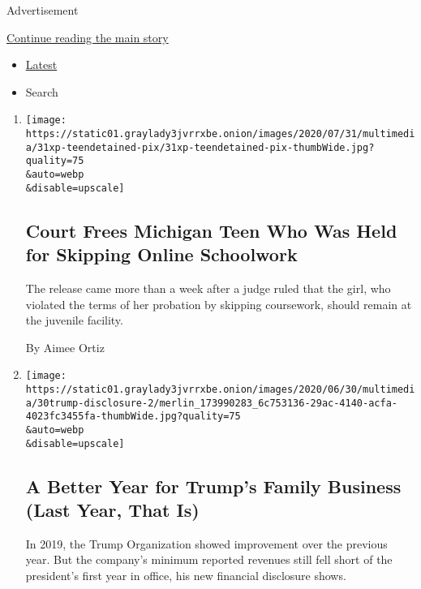 Advertisement

\protect\hyperlink{after-mid1}{Continue reading the main story}

\begin{itemize}
\tightlist
\item
  \protect\hyperlink{stream-panel}{Latest}
\item
  Search
\end{itemize}

\begin{enumerate}
\def\labelenumi{\arabic{enumi}.}
\item
  \href{/2020/07/31/us/michigan-teen-homework-release.html}{}

  \texttt{[image: https://static01.graylady3jvrrxbe.onion/images/2020/07/31/multimedia/31xp-teendetained-pix/31xp-teendetained-pix-thumbWide.jpg?quality=75\\\&auto=webp\\\&disable=upscale]}

  \hypertarget{court-frees-michigan-teen-who-was-held-for-skipping-online-schoolwork}{%
  \subsection{Court Frees Michigan Teen Who Was Held for Skipping Online
  Schoolwork}\label{court-frees-michigan-teen-who-was-held-for-skipping-online-schoolwork}}

  The release came more than a week after a judge ruled that the girl,
  who violated the terms of her probation by skipping coursework, should
  remain at the juvenile facility.

  By Aimee Ortiz
\item
  \href{/2020/07/31/business/trump-financial-disclosure.html}{}

  \texttt{[image: https://static01.graylady3jvrrxbe.onion/images/2020/06/30/multimedia/30trump-disclosure-2/merlin\_173990283\_6c753136-29ac-4140-acfa-4023fc3455fa-thumbWide.jpg?quality=75\\\&auto=webp\\\&disable=upscale]}

  \hypertarget{a-better-year-for-trumps-family-business-last-year-that-is}{%
  \subsection{A Better Year for Trump's Family Business (Last Year, That
  Is)}\label{a-better-year-for-trumps-family-business-last-year-that-is}}

  In 2019, the Trump Organization showed improvement over the previous
  year. But the company's minimum reported revenues still fell short of
  the president's first year in office, his new financial disclosure
  shows.


\end{enumerate}
